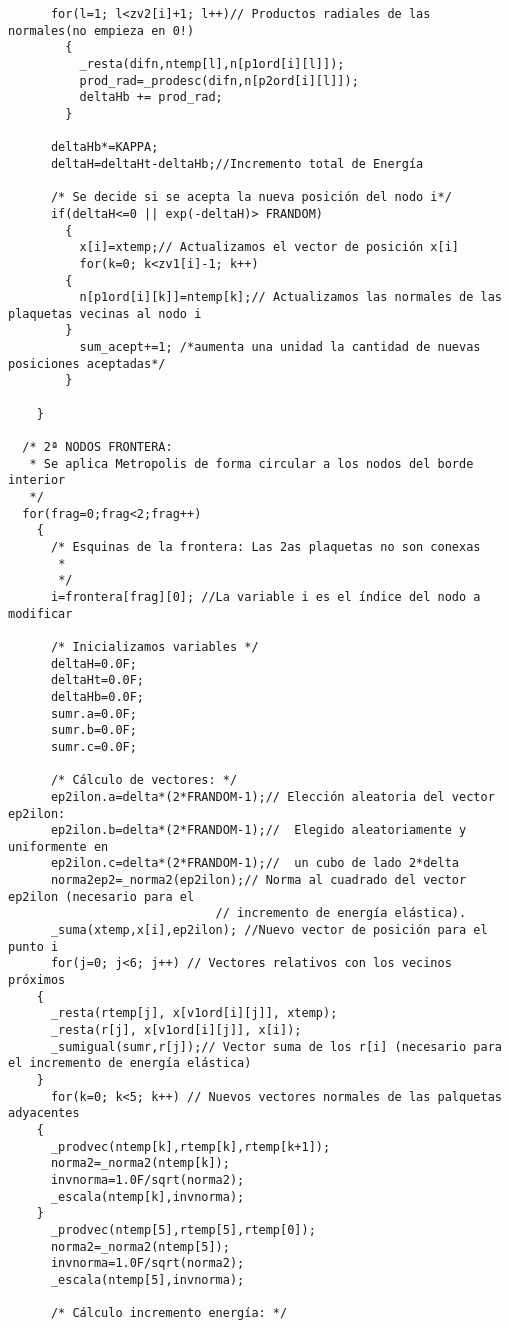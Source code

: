 \begin{verbatim}
	  for(l=1; l<zv2[i]+1; l++)// Productos radiales de las normales(no empieza en 0!)
	    {
	      _resta(difn,ntemp[l],n[p1ord[i][l]]);
	      prod_rad=_prodesc(difn,n[p2ord[i][l]]);
	      deltaHb += prod_rad;
	    }
	 
	  deltaHb*=KAPPA;
	  deltaH=deltaHt-deltaHb;//Incremento total de Energía
	  
	  /* Se decide si se acepta la nueva posición del nodo i*/
	  if(deltaH<=0 || exp(-deltaH)> FRANDOM)
	    {
	      x[i]=xtemp;// Actualizamos el vector de posición x[i]
	      for(k=0; k<zv1[i]-1; k++)
		{
		  n[p1ord[i][k]]=ntemp[k];// Actualizamos las normales de las plaquetas vecinas al nodo i
 		}
	      sum_acept+=1; /*aumenta una unidad la cantidad de nuevas posiciones aceptadas*/
	    }
	
    }
     
  /* 2ª NODOS FRONTERA:
   * Se aplica Metropolis de forma circular a los nodos del borde interior
   */
  for(frag=0;frag<2;frag++)
    {
      /* Esquinas de la frontera: Las 2as plaquetas no son conexas
       * 
       */
      i=frontera[frag][0]; //La variable i es el índice del nodo a modificar

      /* Inicializamos variables */
      deltaH=0.0F;
      deltaHt=0.0F;
      deltaHb=0.0F;
      sumr.a=0.0F;
      sumr.b=0.0F;
      sumr.c=0.0F;

      /* Cálculo de vectores: */      
      ep2ilon.a=delta*(2*FRANDOM-1);// Elección aleatoria del vector ep2ilon:
      ep2ilon.b=delta*(2*FRANDOM-1);//  Elegido aleatoriamente y uniformente en   
      ep2ilon.c=delta*(2*FRANDOM-1);//  un cubo de lado 2*delta
      norma2ep2=_norma2(ep2ilon);// Norma al cuadrado del vector ep2ilon (necesario para el 
	                         // incremento de energía elástica).
      _suma(xtemp,x[i],ep2ilon); //Nuevo vector de posición para el punto i
      for(j=0; j<6; j++) // Vectores relativos con los vecinos próximos
	{
	  _resta(rtemp[j], x[v1ord[i][j]], xtemp);
	  _resta(r[j], x[v1ord[i][j]], x[i]); 
	  _sumigual(sumr,r[j]);// Vector suma de los r[i] (necesario para el incremento de energía elástica)
	}
      for(k=0; k<5; k++) // Nuevos vectores normales de las palquetas adyacentes
	{
	  _prodvec(ntemp[k],rtemp[k],rtemp[k+1]);
	  norma2=_norma2(ntemp[k]);
	  invnorma=1.0F/sqrt(norma2);
	  _escala(ntemp[k],invnorma);
	}
      _prodvec(ntemp[5],rtemp[5],rtemp[0]);
      norma2=_norma2(ntemp[5]);
      invnorma=1.0F/sqrt(norma2);
      _escala(ntemp[5],invnorma);

      /* Cálculo incremento energía: */


\end{verbatim}
